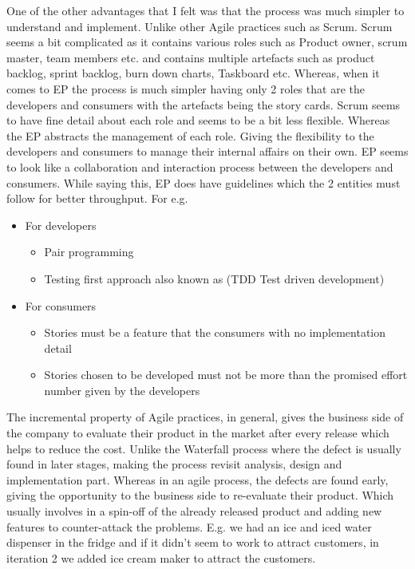 \documentclass[12pt]{article}
\begin{document}
One of the other advantages that I felt was that the process was much simpler to understand and implement. Unlike other Agile practices such as Scrum. Scrum seems a bit complicated as it contains various roles such as Product owner, scrum master, team members etc. and contains multiple artefacts such as product backlog, sprint backlog, burn down charts, Taskboard etc. Whereas, when it comes to EP the process is much simpler having only 2 roles that are the developers and consumers with the artefacts being the story cards. Scrum seems to have fine detail about each role and seems to be a bit less flexible. Whereas the EP abstracts the management of each role. Giving the flexibility to the developers and consumers to manage their internal affairs on their own. EP seems to look like a collaboration and interaction process between the developers and consumers. While saying this, EP does have guidelines which the 2 entities must follow for better throughput. For e.g.
\begin{itemize}
    \item For developers
          \begin{itemize}
              \item Pair programming
              \item Testing first approach also known as (TDD Test driven development)
          \end{itemize}
    \item For consumers
          \begin{itemize}
              \item Stories must be a feature that the consumers with no implementation detail
              \item Stories chosen to be developed must not be more than the promised effort number given by the developers
          \end{itemize}
\end{itemize}

The incremental property of Agile practices, in general, gives the business side of the company to evaluate their product in the market after every release which helps to reduce the cost. Unlike the Waterfall process where the defect is usually found in later stages, making the process revisit analysis, design and implementation part. Whereas in an agile process, the defects are found early, giving the opportunity to the business side to re-evaluate their product. Which usually involves in a spin-off of the already released product and adding new features to counter-attack the problems. E.g. we had an ice and iced water dispenser in the fridge and if it didn't seem to work to attract customers, in iteration 2 we added ice cream maker to attract the customers.
\end{document}
